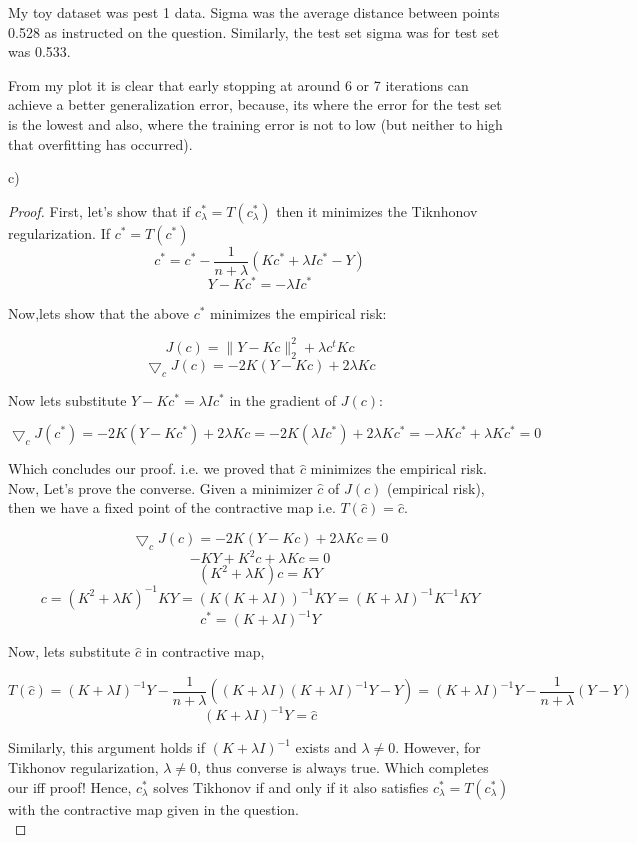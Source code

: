 \documentclass[12pt]{report}
\begin{document}
My toy dataset was pest 1 data. Sigma was the average distance between points 0.528 as instructed on the question. Similarly, the test set sigma was for test set was 0.533.

From my plot it is clear that early stopping at around 6 or 7 iterations can achieve a better generalization error, because, its where the error for the test set is the lowest and also, where the training error is not to low (but neither to high that overfitting has occurred).


c) \begin{proof}
First, let's show that if $c_{\lambda}^* = T(c_{\lambda}^*)$  then it minimizes the Tiknhonov regularization.
If $ c^* = T(c^*) $ 
$$ c^* = c^* - \frac{1}{n+\lambda}(Kc^*+\lambda Ic^*-Y) $$
$$ Y - Kc^* = - \lambda Ic^* $$

Now,lets show that the above $c^*$ minimizes the empirical risk:

$$ J(c) = \|Y-Kc\|_2^2 + \lambda c^t K c $$
$$ \bigtriangledown_c J(c) = -2K(Y-Kc) + 2\lambda K c $$

Now lets substitute $Y-Kc^* = \lambda I c^*$ in the gradient of $J(c)$:

$$\bigtriangledown_c J(c^*) = -2K(Y-Kc^*) + 2\lambda K c  = -2K(\lambda I c^*) + 2\lambda K c^* = - \lambda K c^* + \lambda K c^* = 0 $$

Which concludes our proof. i.e. we proved that $\hat{c}$ minimizes the empirical risk. \\

Now, Let's prove the converse. Given a minimizer $\hat{c}$ of $J(c)$ (empirical risk), then we have a fixed point of the contractive map i.e. $T(\hat{c}) = \hat{c}$.

$$ \bigtriangledown_c J(c) = -2K(Y-Kc) + 2\lambda K c = 0 $$
$$ -KY + K^2c + \lambda K c = 0$$
$$ (K^2 + \lambda K)c = KY $$
$$ c = (K^2 + \lambda K)^{-1}KY = (K(K + \lambda I))^{-1}KY = (K + \lambda I)^{-1}K^{-1}KY $$
$$ c^* = (K + \lambda I)^{-1} Y $$

Now, lets substitute $\hat{c}$ in contractive map,

$$ T(\hat{c}) = (K + \lambda I)^{-1} Y - \frac{1}{n+\lambda}((K + \lambda I)(K + \lambda I)^{-1} Y-Y) = (K + \lambda I)^{-1} Y - \frac{1}{n+\lambda}(Y-Y) $$
$$ (K + \lambda I)^{-1} Y = \hat{c}$$

Similarly, this argument holds if $(K + \lambda I)^{-1}$ exists and $\lambda \neq 0$. However, for Tikhonov regularization, $\lambda \neq 0$, thus converse is always true. Which completes our iff proof! Hence, $c_{\lambda}^*$ solves Tikhonov if and only if it also satisfies $c_{\lambda}^* = T(c_{\lambda}^*)$ with the contractive map given in the question. \\
\end{proof}
\end{document}
